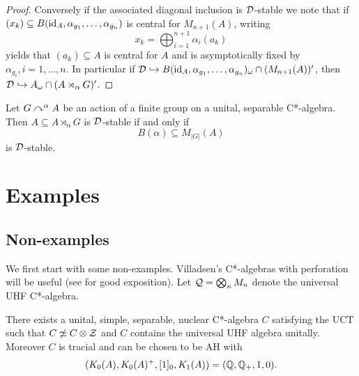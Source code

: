 \documentclass[12pt]{amsart}
\begin{document}
\begin{prop}
\begin{proof}
              Conversely if the associated diagonal inclusion is $\mathcal{D}$-stable we note that if $(x_k) \subseteq B(\text{id}_A,\alpha_{g_1},\dots,\alpha_{g_n})$ is central for $M_{n+1}(A)$, writing
              \begin{equation}
              x_k = \bigoplus_{i=1}^{n+1}\alpha_i(a_k)
              \end{equation}
               yields that $(a_k) \subseteq A$ is central for $A$ and is asymptotically fixed by $\alpha_{g_i}, i=1,\dots,n$. In particular if $\mathcal{D} \hookrightarrow B(\text{id}_A,\alpha_{g_1},\dots,\alpha_{g_n})_\omega \cap (M_{n+1}(A))'$, then $\mathcal{D} \hookrightarrow A_\omega \cap (A \rtimes_\alpha G)'$. 
          \end{proof}
      \end{prop}

        \begin{cor}
          Let $G \curvearrowright^\alpha A$ be an action of a finite group on a unital, separable C*-algebra. Then $A \subseteq A \rtimes_\alpha G$ is $\mathcal{D}$-stable if and only if
\begin{equation}
          B(\alpha) \subseteq M_{|G|}(A)
\end{equation}
          is $\mathcal{D}$-stable. 
        \end{cor}


  \section{Examples}\label{section:dse-examples}

  \subsection{Non-examples}\label{ssection:dse-non-examples}
  We first start with some non-examples. Villadsen's C*-algebras with perforation will be useful (see \cite{TomsWinter09} for good exposition). Let $\mathcal{Q} = \bigotimes_n M_n$ denote the universal UHF C*-algebra.

  \begin{theorem}
      There exists a unital, simple, separable, nuclear C*-algebra $C$ satisfying the UCT such that $C \not\simeq C \otimes \mathcal{Z}$ and $C$ contains the universal UHF algebra unitally. Moreover $C$ is tracial and can be chosen to be AH with
\begin{equation}
       (K_0(A),K_0(A)^+,[1]_0,K_1(A)) = (\mathbb{Q},\mathbb{Q}_+,1,0).
\end{equation}
    \end{theorem}
\end{document}
